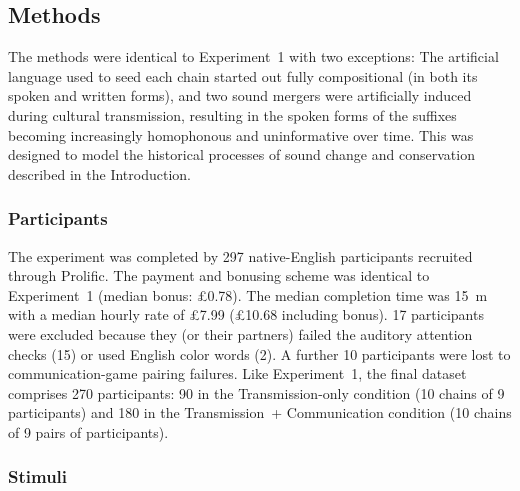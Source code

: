 \documentclass[doc,biblatex]{apa7}
\begin{document}
\subsection{Methods}

The methods were identical to Experiment~1 with two exceptions: The artificial language used to seed each chain started out fully compositional (in both its spoken and written forms), and two sound mergers were artificially induced during cultural transmission, resulting in the spoken forms of the suffixes becoming increasingly homophonous and uninformative over time. This was designed to model the historical processes of sound change and conservation described in the Introduction.

\subsubsection{Participants}

The experiment was completed by 297 native-English participants recruited through Prolific. The payment and bonusing scheme was identical to Experiment~1 (median bonus: £0.78). The median completion time was 15~m with a median hourly rate of £7.99 (£10.68 including bonus). 17 participants were excluded because they (or their partners) failed the auditory attention checks (15) or used English color words (2). A further 10 participants were lost to communication-game pairing failures. Like Experiment~1, the final dataset comprises 270 participants: 90 in the Transmission-only condition (10 chains of 9 participants) and 180 in the Transmission~+ Communication condition (10 chains of 9 pairs of participants).

\subsubsection{Stimuli}
\end{document}
